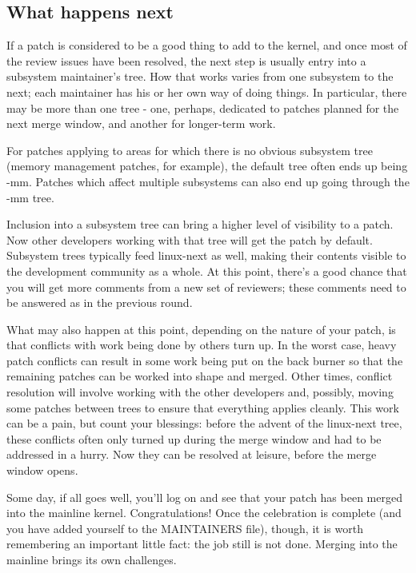 \documentclass[a4paper,8pt,english]{sphinxmanual}
\begin{document}
\subsection{What happens next}
\label{process/6.Followthrough:what-happens-next}
If a patch is considered to be a good thing to add to the kernel, and once
most of the review issues have been resolved, the next step is usually
entry into a subsystem maintainer's tree.  How that works varies from one
subsystem to the next; each maintainer has his or her own way of doing
things.  In particular, there may be more than one tree - one, perhaps,
dedicated to patches planned for the next merge window, and another for
longer-term work.

For patches applying to areas for which there is no obvious subsystem tree
(memory management patches, for example), the default tree often ends up
being -mm.  Patches which affect multiple subsystems can also end up going
through the -mm tree.

Inclusion into a subsystem tree can bring a higher level of visibility to a
patch.  Now other developers working with that tree will get the patch by
default.  Subsystem trees typically feed linux-next as well, making their
contents visible to the development community as a whole.  At this point,
there's a good chance that you will get more comments from a new set of
reviewers; these comments need to be answered as in the previous round.

What may also happen at this point, depending on the nature of your patch,
is that conflicts with work being done by others turn up.  In the worst
case, heavy patch conflicts can result in some work being put on the back
burner so that the remaining patches can be worked into shape and merged.
Other times, conflict resolution will involve working with the other
developers and, possibly, moving some patches between trees to ensure that
everything applies cleanly.  This work can be a pain, but count your
blessings: before the advent of the linux-next tree, these conflicts often
only turned up during the merge window and had to be addressed in a hurry.
Now they can be resolved at leisure, before the merge window opens.

Some day, if all goes well, you'll log on and see that your patch has been
merged into the mainline kernel.  Congratulations!  Once the celebration is
complete (and you have added yourself to the MAINTAINERS file), though, it
is worth remembering an important little fact: the job still is not done.
Merging into the mainline brings its own challenges.
\end{document}
